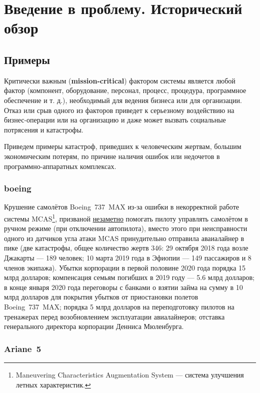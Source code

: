 \chapter{Введение в проблему. Исторический обзор}\label{ch:ch1}

\section{Примеры}
Критически важным (\textbf{mission-critical}) фактором системы является любой фактор
(компонент, оборудование, персонал, процесс, процедура, программное обеспечение и т. д.),
необходимый для ведения бизнеса или для организации.
Отказ или срыв одного из факторов приведет к серьезному воздействию на бизнес-операции или на организацию
и даже может вызвать социальные потрясения и катастрофы.

Приведем примеры катастроф, приведших к человеческим жертвам, большим экономическим потерям,
по причине наличия ошибок или недочетов в программно-аппаратных комплексах.

\subsection{boeing}

Крушение самолётов Boeing~737~MAX из-за ошибки в некорректной работе системы MCAS\footnote{Maneuvering Characteristics Augmentation System --- система улучшения летных характеристик.},
призваной \underline{незаметно} помогать пилоту управлять самолётом в ручном режиме (при отключении автопилота),
вместо этого при неисправности одного из датчиков угла атаки MCAS принудительно отправила аваиалайнер в пике
(две катастрофы, общее количество жертв 346:
    29 октября 2018 года возле Джакарты --- 189 человек;
    10 марта 2019 года в Эфиопии --- 149 пассажиров и 8 членов экипажа).
Убытки корпорации в первой половине 2020 года порядка 15 млрд долларов;
компенсация семьям погибших в 2019 году --- 5.6 млрд долларов;
в конце января 2020 года переговоры с банками о взятии займа на сумму в 10 млрд долларов для покрытия убытков от приостановки полетов Boeing~737~MAX;
порядка 5 млрд долларов на переподготовку пилотов на тренажерах перед возобновлением эксплуатации авиалайнеров;
отставка генерального директора корпорации Денниса Мюленбурга.


\subsection{Ariane~5}

